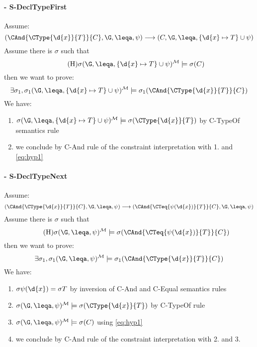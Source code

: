 \paragraph{- \sc S-DeclTypeFirst}
Assume:
$$(\CAnd{\CType{\d{x}}{T}}{C},\G,\leqa,\psi) \longrightarrow ({C}, \G, \leqa, \{\d{x} \mapsto T\}\cup\psi) $$
Assume there is $\sigma$ such that 
\begin{equation}\tag{H}
  \label{eq:hyp1}
\sigma(\G,\leqa,\{\d{x} \mapsto T\}\cup\psi)\tomod\models \sigma({C})
\end{equation}
then we want to prove:
\begin{equation*}
\exists \sigma_1, \sigma_1(\G,\leqa,\{\d{x} \mapsto T\}\cup\psi)\tomod\models \sigma_1(\CAnd{\CType{\d{x}}{T}}{C})
\end{equation*}
We have:  
\begin{enumerate}
 \item $\sigma(\G,\leqa,\{\d{x} \mapsto T\}\cup\psi)\tomod\models \sigma(\CType{\d{x}}{T})$ by {\sf C-TypeOf} semantics rule
 \item we conclude by {\sc C-And} rule of the constraint interpretation with 1. and \ref{eq:hyp1}
\end{enumerate}
\sepa
\paragraph{- \sc S-DeclTypeNext}
Assume:
$$(\CAnd{\CType{\d{x}}{T}}{C},\G,\leqa,\psi) \longrightarrow (\CAnd{\CTeq{\psi(\d{x})}{T}}{C}, \G, \leqa, \psi) $$
Assume there is $\sigma$ such that 
\begin{equation}\tag{H}
  \label{eq:hyp1}
\sigma(\G,\leqa,\psi)\tomod\models \sigma(\CAnd{\CTeq{\psi(\d{x})}{T}}{C})
\end{equation}
then we want to prove:
\begin{equation*}
\exists \sigma_1, \sigma_1(\G,\leqa,\psi)\tomod\models \sigma_1(\CAnd{\CType{\d{x}}{T}}{C})
\end{equation*}
We have:    
\begin{enumerate}
 \item $\sigma \psi(\d{x}) = \sigma T$ by inversion of {\sc C-And} and {\sf C-Equal} semantics rules
 \item $\sigma(\G,\leqa,\psi)\tomod\models \sigma(\CType{\d{x}}{T})$ by {\sf C-TypeOf} rule 
 \item $\sigma(\G,\leqa,\psi)\tomod\models \sigma(C)$ using \ref{eq:hyp1}   
 \item we conclude by {\sc C-And} rule of the constraint interpretation with 2. and 3.
\end{enumerate}
\sepa
